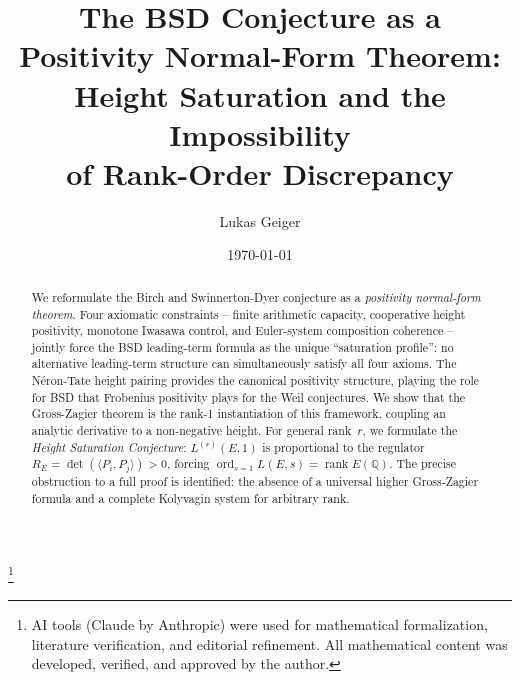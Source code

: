 \documentclass[aps,prd,twocolumn,superscriptaddress,nofootinbib]{revtex4-2}
\theoremstyle{definition}
\theoremstyle{remark}
\DeclareMathOperator{\ord}{ord}
\DeclareMathOperator{\rank}{rank}
\begin{document}

\title{The BSD Conjecture as a Positivity Normal-Form Theorem:\\Height Saturation and the Impossibility\\of Rank-Order Discrepancy}

\author{Lukas Geiger}

\date{\today}

\begin{abstract}
We reformulate the Birch and Swinnerton-Dyer conjecture as a \textit{positivity normal-form theorem}. Four axiomatic constraints -- finite arithmetic capacity, cooperative height positivity, monotone Iwasawa control, and Euler-system composition coherence -- jointly force the BSD leading-term formula as the unique ``saturation profile'': no alternative leading-term structure can simultaneously satisfy all four axioms. The N\'eron-Tate height pairing provides the canonical positivity structure, playing the role for BSD that Frobenius positivity plays for the Weil conjectures. We show that the Gross-Zagier theorem is the rank-1 instantiation of this framework, coupling an analytic derivative to a non-negative height. For general rank~$r$, we formulate the \textit{Height Saturation Conjecture}: $L^{(r)}(E,1)$ is proportional to the regulator $R_E = \det(\langle P_i, P_j \rangle) > 0$, forcing $\ord_{s=1} L(E,s) = \rank E(\mathbb{Q})$. The precise obstruction to a full proof is identified: the absence of a universal higher Gross-Zagier formula and a complete Kolyvagin system for arbitrary rank.
\end{abstract}


\thanks{AI tools (Claude by Anthropic) were used for mathematical formalization, literature verification, and editorial refinement. All mathematical content was developed, verified, and approved by the author.}

\maketitle
\end{document}
